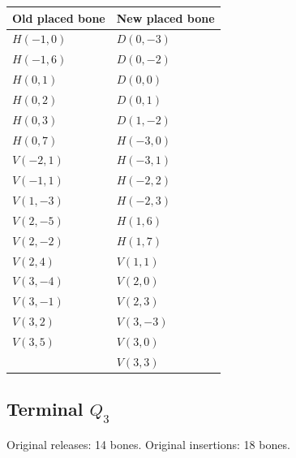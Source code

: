 \documentclass[
  11pt,
]{article}
\begin{document}
\begin{longtable}[]{@{}ll@{}}
\toprule\noalign{}
Old placed bone & New placed bone \\
\midrule\noalign{}
\endhead
\bottomrule\noalign{}
\endlastfoot
\(H(-1,0)\) & \(D(0,-3)\) \\
\(H(-1,6)\) & \(D(0,-2)\) \\
\(H(0,1)\) & \(D(0,0)\) \\
\(H(0,2)\) & \(D(0,1)\) \\
\(H(0,3)\) & \(D(1,-2)\) \\
\(H(0,7)\) & \(H(-3,0)\) \\
\(V(-2,1)\) & \(H(-3,1)\) \\
\(V(-1,1)\) & \(H(-2,2)\) \\
\(V(1,-3)\) & \(H(-2,3)\) \\
\(V(2,-5)\) & \(H(1,6)\) \\
\(V(2,-2)\) & \(H(1,7)\) \\
\(V(2,4)\) & \(V(1,1)\) \\
\(V(3,-4)\) & \(V(2,0)\) \\
\(V(3,-1)\) & \(V(2,3)\) \\
\(V(3,2)\) & \(V(3,-3)\) \\
\(V(3,5)\) & \(V(3,0)\) \\
& \(V(3,3)\) \\
\end{longtable}


\subsection{\texorpdfstring{Terminal
\(Q_3\)}{Terminal Q\_3}}\label{terminal-q_3}

Original releases: 14 bones. Original insertions: 18 bones.
\end{document}
